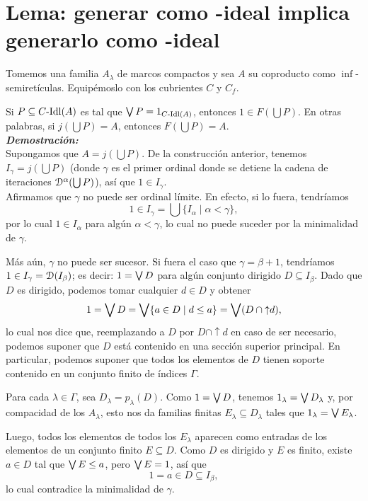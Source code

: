 \section{Lema: generar como -ideal implica generarlo como -ideal}
    Tomemos una familia $A_\lambda$ de marcos compactos
    y sea $A$ su coproducto como $\inf$-semiretículas.
    Equipémoslo con los cubrientes $C$ y $C_f$.
    
    Si $P\subseteq C\text{-}\mathrm{Idl}(A)$ es tal que $\bigvee P=1_{C\text{-}\mathrm{Idl}(A)}$,
    entonces $1\in F(\bigcup P)$.
    En otras palabras, si
    $j(\bigcup P)=A$, entonces $F(\bigcup P)=A$.
    \\
    \textbf{\emph{Demostración:}} \\
    Supongamos que $A=j(\bigcup P)$.
    De la construcción anterior, tenemos
    $I_\gamma=j(\bigcup P)$ (donde $\gamma$ es el primer
    ordinal donde se detiene la cadena de iteraciones
    $\mathcal D^\alpha(\bigcup P)$),
    así que $1\in I_\gamma$. \\
    Afirmamos que $\gamma$ no puede ser ordinal límite.
    En efecto, si lo fuera, tendríamos
    \[
        1 \in I_\gamma = \bigcup\{I_\alpha \mid \alpha<\gamma\}
    ,\]
    por lo cual $1\in I_\alpha$ para algún $\alpha<\gamma$, lo
    cual no puede suceder por la minimalidad de $\gamma$.

    Más aún, $\gamma$ no puede ser sucesor.
    Si fuera el caso que $\gamma=\beta+1$, tendríamos
    $1\in I_\gamma = \mathcal D(I_\beta)$;
    es decir: $1=\bigvee D$ para algún conjunto dirigido
    $D\subseteq I_\beta$.
    Dado que $D$ es dirigido, podemos tomar cualquier
    $d\in D$ y obtener
    \[
        1
        = \bigvee D
        = \bigvee\{a\in D\mid d\leq a\}
        = \bigvee(D\cap{\uparrow}d)
    ,\]
    lo cual nos dice que,
    reemplazando a $D$ por $D\cap{\uparrow}d$ en
    caso de ser necesario,
    podemos suponer que $D$ está contenido en una
    sección superior principal.
    En particular, podemos suponer que todos los elementos
    de $D$ tienen soporte contenido en
    un conjunto finito de índices $\Gamma$.

    Para cada $\lambda\in\Gamma$, sea $D_\lambda=p_\lambda(D)$.
    Como $1=\bigvee D$, tenemos $1_\lambda=\bigvee D_\lambda$ y,
    por compacidad de los $A_\lambda$, esto nos da familias finitas
    $E_\lambda\subseteq D_\lambda$ tales que
    $1_\lambda=\bigvee E_\lambda$.
    
    Luego, todos los elementos de todos los $E_\lambda$ aparecen
    como entradas de los elementos de un conjunto finito
    $E\subseteq D$.
    Como $D$ es dirigido y $E$ es finito,
    existe $a\in D$ tal que $\bigvee E\leq a$,
    pero $\bigvee E=1$, así que
    \[
        1 = a \in D\subseteq I_\beta
    ,\]
    lo cual contradice la minimalidad de $\gamma$.
    
